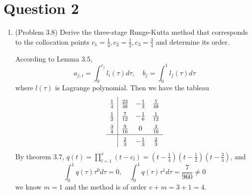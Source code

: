 \documentclass[10pt]{report}
\newcommand{\dintt}[4] {\int_{#1}^{#2} #3 d#4}
\begin{document}
\section*{Question 2}
\begin{enumerate}
	\item 
	(Problem 3.8) Derive the three-stage Runge-Kutta method that corresponds to the collocation points $c_1 = \frac{1}{4}, c_2 = \frac{1}{2}, c_3 = \frac{3}{4}$ and determine its order.
	
	According to Lemma 3.5,
	\[
	a_{j,i} = \dintt{0}{c_j}{l_i(\tau)}{\tau},\quad b_j = \dintt{0}{1}{l_j(\tau)}{\tau}
	\]
	where $l(\tau)$ is Lagrange polynomial. Then we have the tableau
	\[
	\renewcommand{\arraystretch}{1.5}
	\begin{array}{c|ccc}
	\frac{1}{4} & \frac{23}{48} & -\frac{1}{3} & \frac{5}{48}\\
	\frac{1}{2} & \frac{7}{12} & -\frac{1}{6} & \frac{1}{12}\\
	\frac{3}{4} & \frac{9}{16} & 0 & \frac{3}{16}\\ \hline
	& \frac{2}{3} & -\frac{1}{3} & \frac{2}{3}
	\end{array}
	\]
	By theorem 3.7, $q(t) = \prod_{l=1}^{v} (t-c_l) = (t-\frac{1}{4})(t-\frac{1}{2})(t-\frac{3}{4})$, and
	\[
	\dintt{0}{1}{q(\tau)\tau^0}{\tau} = 0, \quad \dintt{0}{1}{q(\tau)\tau^1}{\tau} = \frac{7}{960} \ne 0
	\]
	we know $m=1$ and the method is of order $v+m = 3+1 = 4$.
\end{enumerate}
\end{document}
